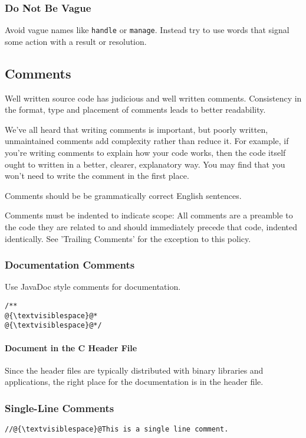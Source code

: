 \documentclass[fleqn,12pt]{PARCOneColumn} %
\begin{document}
\subsubsection{Do Not Be Vague}
Avoid vague names like {\tt handle} or {\tt manage}.  Instead try to use words that signal some action with a result or resolution.
\subsection{Comments}
Well written source code has judicious and well written comments.
Consistency in the format, type and placement of comments leads to better readability.

We've all heard that writing comments is important,
but poorly written, unmaintained comments add complexity rather than reduce it.
For example, if you're writing comments to explain how your code works,
then the code itself ought to written in a better, clearer, explanatory way.
You may find that you won't need to write the comment in the first place.

Comments should be be grammatically correct English sentences.

Comments must be indented to indicate scope: All comments are a preamble to the code they are related to and should immediately precede that code, indented identically.
See 'Trailing Comments' for the exception to this policy.

\subsubsection{Documentation Comments}

Use JavaDoc style comments for documentation.

\begin{lstlisting}
/**
@{\textvisiblespace}@*
@{\textvisiblespace}@*/
\end{lstlisting}

\paragraph{Document in the C Header File}
Since the header files are typically distributed with binary libraries and applications,
the right place for the documentation is in the header file.

\subsubsection{Single-Line Comments}
\begin{lstlisting}
//@{\textvisiblespace}@This is a single line comment.
\end{lstlisting}
\end{document}
